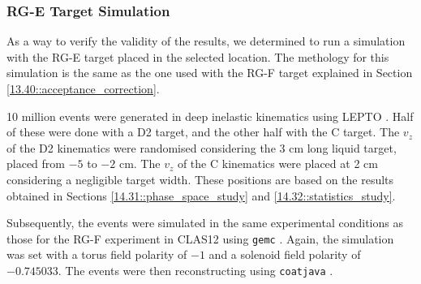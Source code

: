 \subsubsection{RG-E Target Simulation}
\label{14.33::rge_target_simulation}
    As a way to verify the validity of the results, we determined to run a simulation with the RG-E target placed in the selected location.
    The methology for this simulation is the same as the one used with the RG-F target explained in Section \ref{13.40::acceptance_correction}.

    10 million events were generated in deep inelastic kinematics using LEPTO \cite{ingelman1997}.
    Half of these were done with a D2 target, and the other half with the C target.
    The $v_z$ of the D2 kinematics were randomised considering the 3 cm long liquid target, placed from $-5$ to $-2$ cm.
    The $v_z$ of the C kinematics were placed at 2 cm considering a negligible target width.
    These positions are based on the results obtained in Sections \ref{14.31::phase_space_study} and \ref{14.32::statistics_study}.

    Subsequently, the events were simulated in the same experimental conditions as those for the RG-F experiment in CLAS12 using \texttt{gemc} \cite{ungaro2020gemc}.
    Again, the simulation was set with a torus field polarity of $-1$ and a solenoid field polarity of $-0.745033$.
    The events were then reconstructing using \texttt{coatjava} \cite{ziegler2020}.


